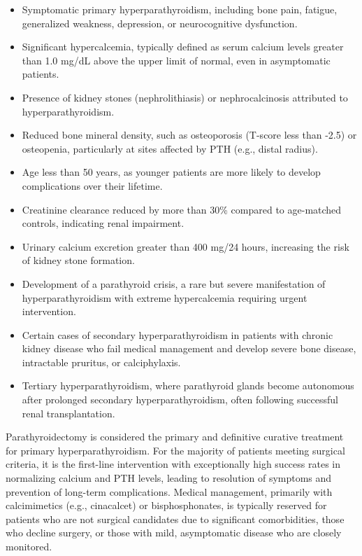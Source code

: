 \begin{itemize}
  \item Symptomatic primary hyperparathyroidism, including bone pain, fatigue, generalized weakness, depression, or neurocognitive dysfunction.
  \item Significant hypercalcemia, typically defined as serum calcium levels greater than 1.0 mg/dL above the upper limit of normal, even in asymptomatic patients.
  \item Presence of kidney stones (nephrolithiasis) or nephrocalcinosis attributed to hyperparathyroidism.
  \item Reduced bone mineral density, such as osteoporosis (T-score less than -2.5) or osteopenia, particularly at sites affected by PTH (e.g., distal radius).
  \item Age less than 50 years, as younger patients are more likely to develop complications over their lifetime.
  \item Creatinine clearance reduced by more than 30\% compared to age-matched controls, indicating renal impairment.
  \item Urinary calcium excretion greater than 400 mg/24 hours, increasing the risk of kidney stone formation.
  \item Development of a parathyroid crisis, a rare but severe manifestation of hyperparathyroidism with extreme hypercalcemia requiring urgent intervention.
  \item Certain cases of secondary hyperparathyroidism in patients with chronic kidney disease who fail medical management and develop severe bone disease, intractable pruritus, or calciphylaxis.
  \item Tertiary hyperparathyroidism, where parathyroid glands become autonomous after prolonged secondary hyperparathyroidism, often following successful renal transplantation.
\end{itemize}

Parathyroidectomy is considered the primary and definitive curative treatment for primary hyperparathyroidism. For the majority of patients meeting surgical criteria, it is the first-line intervention with exceptionally high success rates in normalizing calcium and PTH levels, leading to resolution of symptoms and prevention of long-term complications. Medical management, primarily with calcimimetics (e.g., cinacalcet) or bisphosphonates, is typically reserved for patients who are not surgical candidates due to significant comorbidities, those who decline surgery, or those with mild, asymptomatic disease who are closely monitored.

